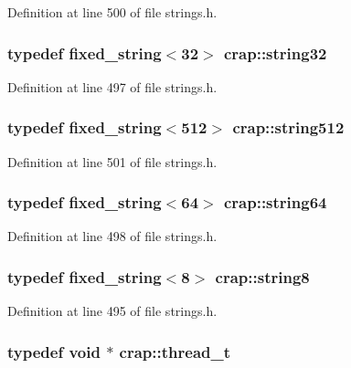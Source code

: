 Definition at line 500 of file strings.\+h.

\hypertarget{namespacecrap_aed2599e591e7287057648c41883194c6}{
\subsubsection[{string32}]{\setlength{\rightskip}{0pt plus 5cm}typedef {\bf fixed\+\_\+string}$<$32$>$ {\bf crap\+::string32}}}\label{namespacecrap_aed2599e591e7287057648c41883194c6}


Definition at line 497 of file strings.\+h.

\hypertarget{namespacecrap_a52392ad28972b8b96725b2f7928d38fa}{
\subsubsection[{string512}]{\setlength{\rightskip}{0pt plus 5cm}typedef {\bf fixed\+\_\+string}$<$512$>$ {\bf crap\+::string512}}}\label{namespacecrap_a52392ad28972b8b96725b2f7928d38fa}


Definition at line 501 of file strings.\+h.

\hypertarget{namespacecrap_a2b8a7358804e1a9c3c32f12d8cdcfdf8}{
\subsubsection[{string64}]{\setlength{\rightskip}{0pt plus 5cm}typedef {\bf fixed\+\_\+string}$<$64$>$ {\bf crap\+::string64}}}\label{namespacecrap_a2b8a7358804e1a9c3c32f12d8cdcfdf8}


Definition at line 498 of file strings.\+h.

\hypertarget{namespacecrap_ac2aa8c51f82e95df485b8fff38837fcb}{
\subsubsection[{string8}]{\setlength{\rightskip}{0pt plus 5cm}typedef {\bf fixed\+\_\+string}$<$8$>$ {\bf crap\+::string8}}}\label{namespacecrap_ac2aa8c51f82e95df485b8fff38837fcb}


Definition at line 495 of file strings.\+h.

\hypertarget{namespacecrap_acd6ada6ce68b7a664e02cc09a05cdeb3}{
\subsubsection[{thread\+\_\+t}]{\setlength{\rightskip}{0pt plus 5cm}typedef void $\ast$ {\bf crap\+::thread\+\_\+t}}}\label{namespacecrap_acd6ada6ce68b7a664e02cc09a05cdeb3}


